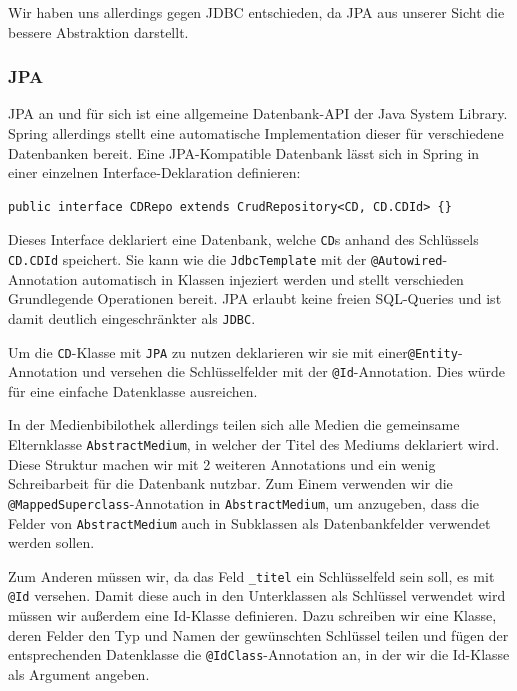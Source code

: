\documentclass{article}
\begin{document}
Wir haben uns allerdings gegen JDBC entschieden, da JPA aus unserer Sicht die bessere Abstraktion darstellt.

\subsubsection{JPA}

JPA an und für sich ist eine allgemeine Datenbank-API der Java System Library.
Spring allerdings stellt eine automatische Implementation dieser für verschiedene Datenbanken bereit.
Eine JPA-Kompatible Datenbank lässt sich in Spring in einer einzelnen Interface-Deklaration definieren:

\begin{lstlisting}
public interface CDRepo extends CrudRepository<CD, CD.CDId> {}
\end{lstlisting}

Dieses Interface deklariert eine Datenbank, welche \texttt{CD}s anhand des Schlüssels \texttt{CD.CDId} speichert.
Sie kann wie die \texttt{JdbcTemplate} mit der \texttt{@Autowired}-Annotation automatisch in Klassen injeziert werden und stellt verschieden Grundlegende Operationen bereit.
JPA erlaubt keine freien SQL-Queries und ist damit deutlich eingeschränkter als \texttt{JDBC}.

Um die \texttt{CD}-Klasse mit \texttt{JPA} zu nutzen deklarieren wir sie mit einer\texttt{@Entity}-Annotation und versehen die Schlüsselfelder mit der \texttt{@Id}-Annotation.
Dies würde für eine einfache Datenklasse ausreichen.

In der Medienbibilothek allerdings teilen sich alle Medien die gemeinsame Elternklasse \texttt{AbstractMedium}, in welcher der Titel des Mediums deklariert wird.
Diese Struktur machen wir mit 2 weiteren Annotations und ein wenig Schreibarbeit für die Datenbank nutzbar.
Zum Einem verwenden wir die \texttt{@MappedSuperclass}-Annotation in \texttt{AbstractMedium}, um anzugeben, dass die Felder von \texttt{AbstractMedium} auch in Subklassen als Datenbankfelder verwendet werden sollen.

Zum Anderen müssen wir, da das Feld \texttt{\_titel} ein Schlüsselfeld sein soll, es mit \texttt{@Id} versehen.
Damit diese auch in den Unterklassen als Schlüssel verwendet wird müssen wir außerdem eine Id-Klasse definieren.
Dazu schreiben wir eine Klasse, deren Felder den Typ und Namen der gewünschten Schlüssel teilen und fügen der entsprechenden Datenklasse die \texttt{@IdClass}-Annotation an, in der wir die Id-Klasse als Argument angeben.
\end{document}
